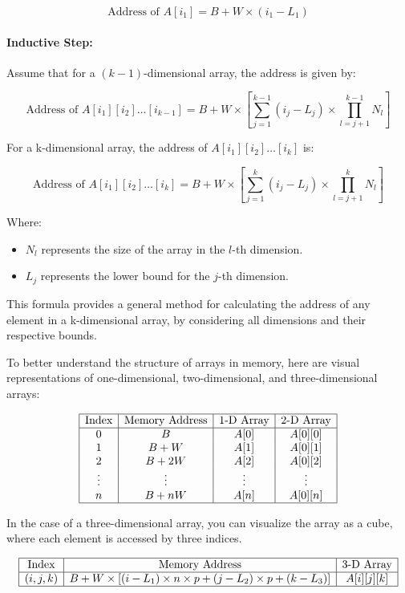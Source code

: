 \documentclass[12pt, oneside]{book}
\begin{document}
\[
\text{Address of } A[i_1] = B + W \times (i_1 - L_1)
\]

\paragraph{Inductive Step:}
Assume that for a \( (k-1) \)-dimensional array, the address is given by:

\[
\text{Address of } A[i_1][i_2] \dots [i_{k-1}] = B + W \times \left[ \sum_{j=1}^{k-1} (i_j - L_j) \times \prod_{l=j+1}^{k-1} N_l \right]
\]

For a k-dimensional array, the address of \( A[i_1][i_2] \dots [i_k] \) is:

\[
\text{Address of } A[i_1][i_2] \dots [i_k] = B + W \times \left[ \sum_{j=1}^{k} (i_j - L_j) \times \prod_{l=j+1}^{k} N_l \right]
\]

Where:
\begin{itemize}
	\item \( N_l \) represents the size of the array in the \( l \)-th dimension.
	\item \( L_j \) represents the lower bound for the \( j \)-th dimension.
\end{itemize}

This formula provides a general method for calculating the address of any element in a k-dimensional array, by considering all dimensions and their respective bounds.

To better understand the structure of arrays in memory, here are visual representations of one-dimensional, two-dimensional, and three-dimensional arrays:

\[
\begin{array}{|c|c|c|c|}
	\hline
	\text{Index} & \text{Memory Address} & \text{1-D Array} & \text{2-D Array} \\
	\hline
	0 & B & A[0] & A[0][0] \\
	1 & B + W & A[1] & A[0][1] \\
	2 & B + 2W & A[2] & A[0][2] \\
	\vdots & \vdots & \vdots & \vdots \\
	n & B + nW & A[n] & A[0][n] \\
	\hline
\end{array}
\]

In the case of a three-dimensional array, you can visualize the array as a cube, where each element is accessed by three indices.

\[
\begin{array}{|c|c|c|}
	\hline
	\text{Index} & \text{Memory Address} & \text{3-D Array} \\
	\hline
	(i, j, k) & B + W \times \left[ (i - L_1) \times n \times p + (j - L_2) \times p + (k - L_3) \right] & A[i][j][k] \\
	\hline
\end{array}
\]
\end{document}
